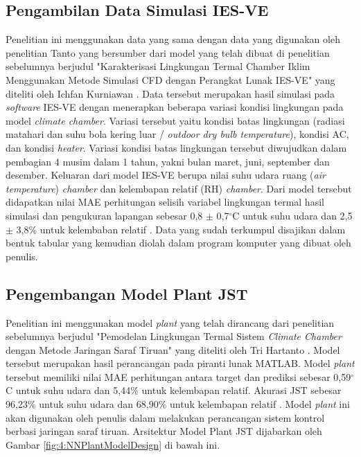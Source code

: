 \subsection{Pengambilan Data Simulasi IES-VE}
Penelitian ini menggunakan data yang sama dengan data yang digunakan oleh penelitian Tanto \cite{skripsiTanto} yang bersumber dari model yang telah dibuat di penelitian sebelumnya berjudul "Karakterisasi Lingkungan Termal Chamber Iklim Menggunakan Metode Simulasi CFD dengan Perangkat Lunak IES-VE" yang diteliti oleh Ichfan Kurniawan \cite{skripsiIchfan}.  Data tersebut merupakan hasil simulasi pada \textit{software} IES-VE dengan menerapkan beberapa variasi kondisi lingkungan pada model \textit{climate chamber}. Variasi tersebut yaitu kondisi batas lingkungan (radiasi matahari dan suhu bola kering luar / \textit{outdoor dry bulb temperature}), kondisi AC, dan kondisi \textit{heater}. Variasi kondisi batas lingkungan tersebut diwujudkan dalam pembagian 4 musim dalam 1 tahun, yakni bulan maret, juni, september dan desember. Keluaran dari model IES-VE berupa nilai suhu udara ruang (\textit{air temperature}) \textit{chamber} dan kelembapan relatif (RH) \textit{chamber}. Dari model tersebut didapatkan nilai MAE perhitungan selisih variabel lingkungan termal hasil simulasi dan pengukuran lapangan sebesar 0,8 $\pm$ 0,7$^{\circ}$C untuk suhu udara dan 2,5 $\pm$ 3,8\% untuk kelembaban relatif \cite{skripsiIchfan}. Data yang sudah terkumpul disajikan dalam bentuk tabular yang kemudian diolah dalam program komputer yang dibuat oleh penulis.

\subsection{Pengembangan Model Plant JST}
Penelitian ini menggunakan model \textit{plant} yang telah dirancang dari penelitian sebelumnya berjudul "Pemodelan Lingkungan Termal Sistem \textit{Climate Chamber} dengan Metode Jaringan Saraf Tiruan" yang diteliti oleh Tri Hartanto \cite{skripsiTanto}. Model tersebut merupakan hasil perancangan pada piranti lunak MATLAB. Model \textit{plant} tersebut memiliki nilai MAE perhitungan antara target dan prediksi sebesar 0,59$^{\circ}$C untuk suhu udara dan 5,44\% untuk kelembapan relatif. Akurasi JST sebesar 96,23\% untuk suhu udara dan 68,90\% untuk kelembapan relatif \cite{skripsiTanto}. Model \textit{plant} ini akan digunakan oleh penulis dalam melakukan perancangan sistem kontrol berbasi jaringan saraf tiruan. Arsitektur Model Plant JST dijabarkan oleh Gambar \ref{fig:4:NNPlantModelDesign} di bawah ini.

